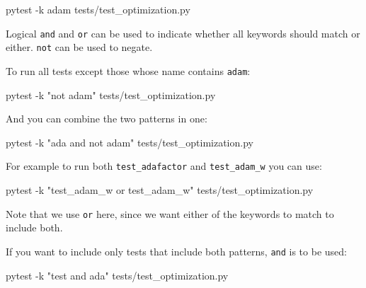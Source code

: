 \documentclass[
]{report}
\newenvironment{Shaded}{\begin{snugshade}}{\end{snugshade}}
\newcommand{\AttributeTok}[1]{\textcolor[rgb]{0.40,0.45,0.13}{#1}}
\newcommand{\ExtensionTok}[1]{\textcolor[rgb]{0.00,0.23,0.31}{#1}}
\newcommand{\NormalTok}[1]{\textcolor[rgb]{0.00,0.23,0.31}{#1}}
\newcommand{\StringTok}[1]{\textcolor[rgb]{0.13,0.47,0.30}{#1}}
\begin{document}
\begin{Shaded}
\begin{Highlighting}[]
\ExtensionTok{pytest} \AttributeTok{{-}k}\NormalTok{ adam tests/test\_optimization.py}
\end{Highlighting}
\end{Shaded}

Logical \texttt{and} and \texttt{or} can be used to indicate whether all
keywords should match or either. \texttt{not} can be used to negate.

To run all tests except those whose name contains \texttt{adam}:

\begin{Shaded}
\begin{Highlighting}[]
\ExtensionTok{pytest} \AttributeTok{{-}k} \StringTok{"not adam"}\NormalTok{ tests/test\_optimization.py}
\end{Highlighting}
\end{Shaded}

And you can combine the two patterns in one:

\begin{Shaded}
\begin{Highlighting}[]
\ExtensionTok{pytest} \AttributeTok{{-}k} \StringTok{"ada and not adam"}\NormalTok{ tests/test\_optimization.py}
\end{Highlighting}
\end{Shaded}

For example to run both \texttt{test\_adafactor} and
\texttt{test\_adam\_w} you can use:

\begin{Shaded}
\begin{Highlighting}[]
\ExtensionTok{pytest} \AttributeTok{{-}k} \StringTok{"test\_adam\_w or test\_adam\_w"}\NormalTok{ tests/test\_optimization.py}
\end{Highlighting}
\end{Shaded}

Note that we use \texttt{or} here, since we want either of the keywords
to match to include both.

If you want to include only tests that include both patterns,
\texttt{and} is to be used:

\begin{Shaded}
\begin{Highlighting}[]
\ExtensionTok{pytest} \AttributeTok{{-}k} \StringTok{"test and ada"}\NormalTok{ tests/test\_optimization.py}
\end{Highlighting}
\end{Shaded}
\end{document}
